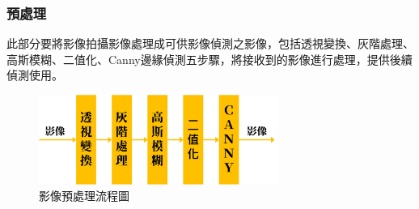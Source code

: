 \documentclass[12pt]{article}       %
\begin{document}
\subsubsection{預處理}
\hspace{2em} 此部分要將影像拍攝影像處理成可供影像偵測之影像，包括透視變換、灰階處理、高斯模糊、二值化、Canny邊緣偵測五步驟，將接收到的影像進行處理，提供後續偵測使用。

\begin{figure}[H]
    \centering
    \includegraphics[width=0.7\textwidth]{11.jpg}     %
    \caption{影像預處理流程圖}    %
    \label{fig:11}    %
\end{figure}
\end{document}
